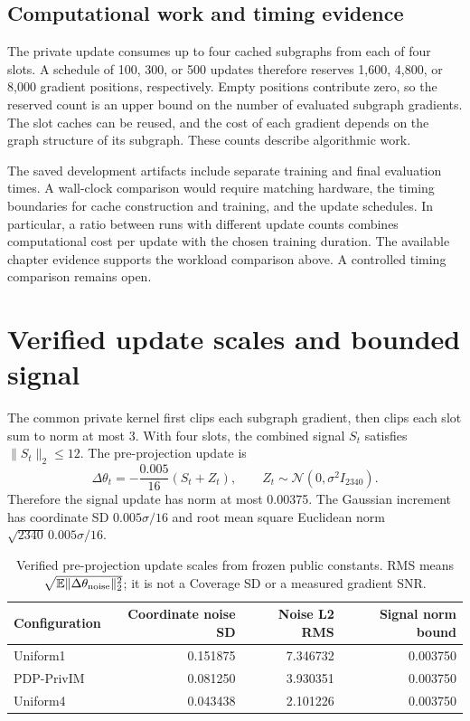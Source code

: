 \subsection{Computational work and timing evidence}
The private update consumes up to four cached subgraphs from each of four slots. A schedule of 100, 300, or 500 updates therefore reserves 1,600, 4,800, or 8,000 gradient positions, respectively. Empty positions contribute zero, so the reserved count is an upper bound on the number of evaluated subgraph gradients. The slot caches can be reused, and the cost of each gradient depends on the graph structure of its subgraph. These counts describe algorithmic work.

The saved development artifacts include separate training and final evaluation times. A wall-clock comparison would require matching hardware, the timing boundaries for cache construction and training, and the update schedules. In particular, a ratio between runs with different update counts combines computational cost per update with the chosen training duration. The available chapter evidence supports the workload comparison above. A controlled timing comparison remains open.

\section{Verified update scales and bounded signal}
The common private kernel first clips each subgraph gradient, then clips each slot sum to norm at most 3. With four slots, the combined signal $S_t$ satisfies $\|S_t\|_2\leq12$. The pre-projection update is
\begin{equation}
 \Delta\theta_t=-\frac{0.005}{16}(S_t+Z_t),\qquad
 Z_t\sim\mathcal N(0,\sigma^2I_{2340}).
\end{equation}
Therefore the signal update has norm at most 0.00375. The Gaussian increment has coordinate SD $0.005\sigma/16$ and root mean square Euclidean norm $\sqrt{2340}\,0.005\sigma/16$.

\begin{table}[htbp]
\centering\small
\caption{Verified pre-projection update scales from frozen public constants. RMS means $\sqrt{\mathbb E\|\Delta\theta_{\rm noise}\|_2^2}$; it is not a Coverage SD or a measured gradient SNR.}\label{tab:noisescale}
\begin{tabular}{lrrr}\toprule
Configuration & Coordinate noise SD & Noise L2 RMS & Signal norm bound\\\midrule
Uniform1 & 0.151875 & 7.346732 & 0.003750\\
PDP-PrivIM & 0.081250 & 3.930351 & 0.003750\\
Uniform4 & 0.043438 & 2.101226 & 0.003750\\\bottomrule
\end{tabular}
\end{table}

